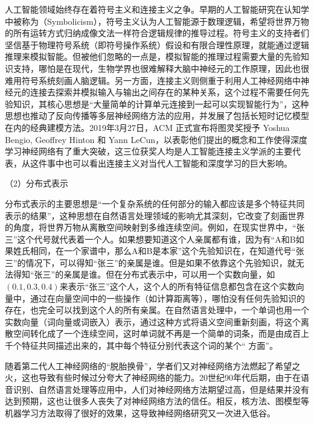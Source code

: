 \parinterval 人工智能领域始终存在着符号主义和连接主义之争。早期的人工智能研究在认知学中被称为{\small{}}（Symbolicism），符号主义认为人工智能源于数理逻辑，希望将世界万物的所有运转方式归纳成像文法一样符合逻辑规律的推导过程。符号主义的支持者们坚信基于物理符号系统（即符号操作系统）假设和有限合理性原理，就能通过逻辑推理来模拟智能。但被他们忽略的一点是，模拟智能的推理过程需要大量的先验知识支持，哪怕是在现代，生物学界也很难解释大脑中神经元的工作原理，因此也很难用符号系统刻画人脑逻辑。另一方面，连接主义则侧重于利用人工神经网络中神经元的连接去探索并模拟输入与输出之间存在的某种关系，这个过程不需要任何先验知识，其核心思想是``大量简单的计算单元连接到一起可以实现智能行为''，这种思想也推动了反向传播等多层神经网络方法的应用，并发展了包括长短时记忆模型在内的经典建模方法。2019年3月27日，ACM 正式宣布将图灵奖授予 Yoshua Bengio, Geoffrey Hinton 和 Yann LeCun，以表彰他们提出的概念和工作使得深度学习神经网络有了重大突破，这三位获奖人均是人工智能连接主义学派的主要代表，从这件事中也可以看出连接主义对当代人工智能和深度学习的巨大影响。

\vspace{0.3em}
\parinterval （2）分布式表示
\vspace{0.3em}

\parinterval 分布式表示的主要思想是``一个复杂系统的任何部分的输入都应该是多个特征共同表示的结果''，这种思想在自然语言处理领域的影响尤其深刻，它改变了刻画世界的角度，将世界万物从离散空间映射到多维连续空间。例如，在现实世界中，``张三''这个代号就代表着一个人。如果想要知道这个人亲属都有谁，因为有``A和B如果姓氏相同，在一个家谱中，那么A和B是本家''这个先验知识在，在知道代号``张三''的情况下，可以得知``张三''的亲属是谁。但是如果不依靠这个先验知识，就无法得知``张三''的亲属是谁。但在分布式表示中，可以用一个实数向量，如$ (0.1,0.3,0.4) $来表示``张三''这个人，这个人的所有特征信息都包含在这个实数向量中，通过在向量空间中的一些操作（如计算距离等），哪怕没有任何先验知识的存在，也完全可以找到这个人的所有亲属。在自然语言处理中，一个单词也用一个实数向量（词向量或词嵌入）表示，通过这种方式将语义空间重新刻画，将这个离散空间转化成了一个连续空间，这时单词就不再是一个简单的词条，而是由成百上千个特征共同描述出来的，其中每个特征分别代表这个词的某个`` 方面''。

\parinterval 随着第二代人工神经网络的``脱胎换骨''，学者们又对神经网络方法燃起了希望之火，这也导致有些时候过分夸大了神经网络的能力。20世纪90年代后期，由于在语音识别、自然语言处理等应用中，人们对神经网络方法期望过高，但是结果并没有达到预期，这也让很多人丧失了对神经网络方法的信任。相反，核方法、图模型等机器学习方法取得了很好的效果，这导致神经网络研究又一次进入低谷。

